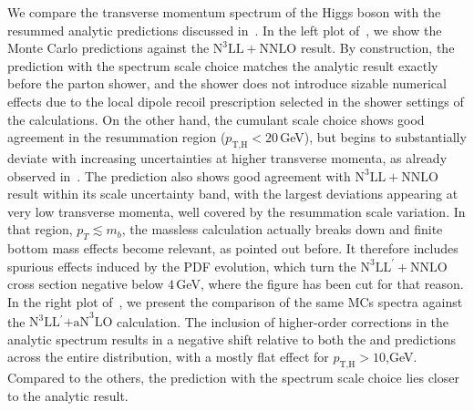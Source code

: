 \documentclass[11pt,a4paper]{article}
\begin{document}
We compare the transverse momentum spectrum of the Higgs boson with the resummed analytic predictions discussed in~. In the left plot of~, we show the Monte Carlo predictions against the $\text{N}^3\text{LL}+\text{NNLO}$ result. By construction, the \GENEVA{} prediction with the spectrum scale choice matches the analytic result exactly before the parton shower, and the shower does not introduce sizable numerical effects due to the local dipole
recoil prescription selected in the shower settings of the calculations. On the other hand, the cumulant scale choice shows good agreement in the resummation region ($p_{\text{T,H}} < 20$\,GeV), but begins to substantially deviate with increasing
uncertainties at higher transverse momenta, as already observed in~. The \minnlo{} prediction also shows good agreement with $\text{N}^3\text{LL}+\text{NNLO}$ result within its scale uncertainty band, with the largest deviations appearing at very low transverse momenta, well covered by the resummation scale variation.
In that region, $p_T\lesssim m_b$, the massless calculation actually 
breaks down and finite bottom mass effects become relevant, as pointed out before.
It therefore includes spurious effects induced by the PDF evolution, which turn 
the $\text{N}^3\text{LL}^{\prime}+\text{NNLO}$ cross section negative below $4$\,GeV, where
the figure has been cut for that reason.
In the right plot of~, we present the comparison of the same MCs spectra against the $\text{N}^3\text{LL$^{\prime}$+aN}^3\text{LO}$ calculation. The inclusion of higher-order corrections in the analytic spectrum results in a negative shift relative to both the \minnlo{} and \GENEVA{} predictions across the entire distribution, with a mostly flat effect for $p_{\text{T,H}} > 10$,GeV. Compared to the others, the \GENEVA{} prediction with the spectrum scale choice lies closer to the analytic result.
\end{document}
